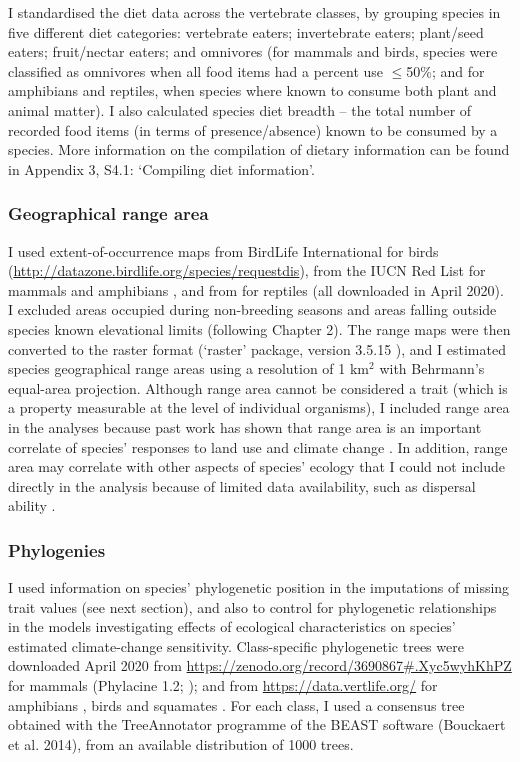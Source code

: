 I standardised the diet data across the vertebrate classes, by grouping species in five different diet categories: vertebrate eaters; invertebrate eaters; plant/seed eaters; fruit/nectar eaters; and omnivores  (for mammals and birds, species were classified as omnivores when all food items had a percent use $\leq$50\%; and for amphibians and reptiles, when species where known to consume both plant and animal matter). I also calculated species diet breadth -- the total number of recorded food items (in terms of presence/absence) known to be consumed by a species. More information on the compilation of dietary information can be found in Appendix 3, S4.1: `Compiling diet information'. 

\subsubsection{Geographical range area}
I used extent-of-occurrence maps from BirdLife International for birds (\url{http://datazone.birdlife.org/species/requestdis}), from the IUCN Red List for mammals and amphibians \citep{IUCN2020}, and from \citet{Roll2017} for reptiles (all downloaded in April 2020). I excluded areas occupied during non-breeding seasons and areas falling outside species known elevational limits (following Chapter 2). The range maps were then converted to the raster format (`raster' package, version 3.5.15 \citet{rasterpackage}), and I estimated species geographical range areas using a resolution of 1 km$^2$ with Behrmann's equal-area projection.  Although range area cannot be considered a trait (which is a property measurable at the level of individual organisms), I included range area in the analyses because past work has shown that range area is an important correlate of species' responses to land use \citep{Newbold2018a} and climate change \citep{Thuiller2005}. In addition, range area may correlate with other aspects of species' ecology that I could not include directly in the analysis because of limited data availability, such as dispersal ability \citep{Capurucho2020}.

\subsubsection{Phylogenies}
I used information on species' phylogenetic position in the imputations of missing trait values (see next section), and also to control for phylogenetic relationships in the models investigating effects of ecological characteristics on species' estimated climate-change sensitivity. Class-specific phylogenetic trees were downloaded April 2020 from \url{https://zenodo.org/record/3690867#.Xyc5wyhKhPZ} for mammals (Phylacine 1.2; \citet{Faurby2018, Faurby2020}); and from \url{https://data.vertlife.org/} for amphibians \citep{Jetz2018}, birds \citep{Jetz2012} and squamates \citep{Tonini2016}. For each class, I used a consensus tree obtained with the TreeAnnotator programme of the BEAST software (Bouckaert et al. 2014), from an available distribution of 1000 trees. 

